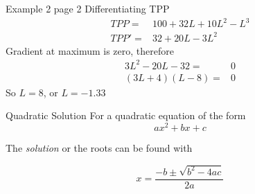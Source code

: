 \documentclass[14pt,xcolor=pdftex,dvipsnames,table, handout]{beamer}
\begin{document}
\begin{frame}{Example 2 page 2}
{Differentiating TPP}
\begin{align*}
TPP  =& 100 + 32L + 10L^2 - L^3\\
TPP' =& 32 +20L -3L^2
\end{align*}
Gradient at maximum is zero, therefore
\begin{align*}
3L^2 - 20L -32 = & 0\\
(3L + 4)(L - 8) =& 0
\end{align*}
So $L = 8$, or $L = -1.33$ 
\end{frame}

\begin{frame}{Quadratic Solution}
For a quadratic equation of the form
\begin{equation*}
ax^2 +bx + c
\end{equation*}

The \emph{solution} or the roots can be found with 
\begin{block}{}
\begin{equation*}
x = \frac{-b \pm \sqrt{b^2 - 4ac}}{2a}
\end{equation*}
\end{block}
\end{frame}
\end{document}
